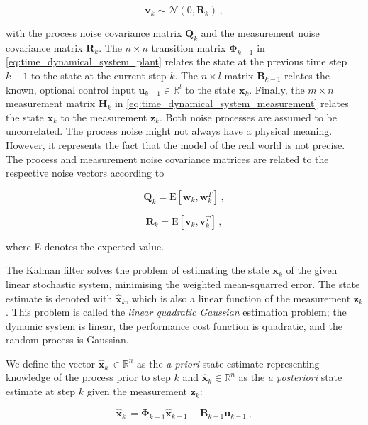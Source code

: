 \begin{equation}\label{eq:measurement_noise}
  \mathbf{v}_{k} \sim \mathcal{N}(0,\mathbf{R}_k)\,,
\end{equation}
 
\noindent
with the process noise covariance matrix $\mathbf{Q}_k$ and the measurement noise covariance matrix $\mathbf{R}_k$. The $n\times n$ transition matrix $\bm{\Phi}_{k-1}$ in \ref{eq:time_dynamical_system_plant} relates the state at the previous time step $k-1$ to the state at the current step $k$. The $n\times l$ matrix $\mathbf{B}_{k-1}$ relates the known, optional control input $\mathbf{u}_{k-1} \in \mathbb{R}^l$ to the state $\mathbf{x}_k$. Finally, the $m\times n$ measurement matrix $\mathbf{H}_{k}$ in \ref{eq:time_dynamical_system_measurement} relates the state $\mathbf{x}_k$ to the measurement $\mathbf{z}_k$. Both noise processes are assumed to be uncorrelated. The process noise might not always have a physical meaning. However, it represents the fact that the model of the real world is not precise. The process and measurement noise covariance matrices are related to the respective noise vectors according to

\begin{equation}
  \mathbf{Q}_k = \mbox{E}[\mathbf{w}_{k},\mathbf{w}^T_{k}]\,,
\end{equation}

\begin{equation}
  \mathbf{R}_k = \mbox{E}[\mathbf{v}_{k},\mathbf{v}^T_{k}]\,,
\end{equation}

\noindent
where E denotes the expected value.

The Kalman filter solves the problem of estimating the state $\mathbf{x}_k$ of the given linear stochastic system, minimising the weighted mean-squarred error. The state estimate is denoted with $\hat{\mathbf{x}}_k$, which is also a linear function of the measurement $\mathbf{z}_k$. This problem is called the \emph{linear quadratic Gaussian} estimation problem; the dynamic system is linear, the performance cost function is quadratic, and the random process is Gaussian.

We define the vector $\hat{\mathbf{x}}^-_k \in \mathbb{R}^n$ as the \emph{a priori} state estimate representing knowledge of the process prior to step $k$ and $\hat{\mathbf{x}}_k \in \mathbb{R}^n$ as the \emph{a posteriori} state estimate at step $k$ given the measurement $\mathbf{z}_k$:

\begin{equation}\label{eq:apriori_estimate}
  \hat{\mathbf{x}}^-_k = \bm{\Phi}_{k-1}\hat{\mathbf{x}}_{k-1}+\mathbf{B}_{k-1}\mathbf{u}_{k-1}\,,
\end{equation}


